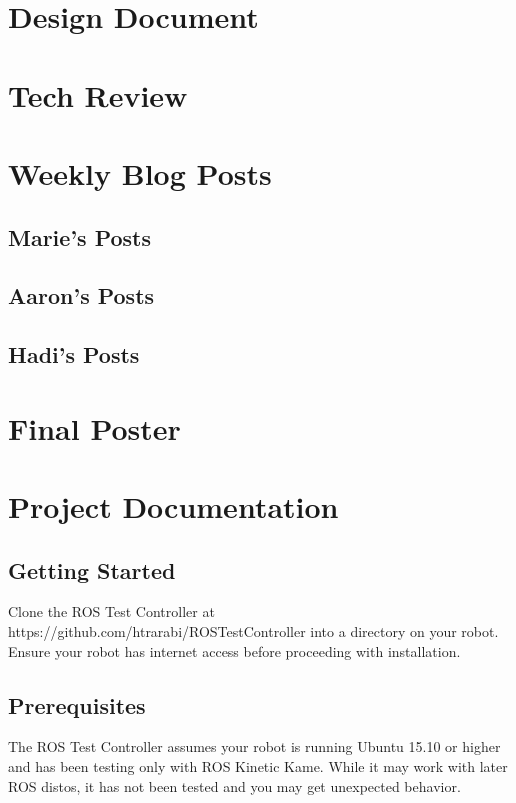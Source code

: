 \documentclass[onecolumn, draftclsnofoot,10pt, compsoc]{report}
\begin{document}
\chapter{Design Document}
\minitoc

\chapter{Tech Review}
\minitoc

\chapter{Weekly Blog Posts}
\minitoc
\section{Marie's Posts}
\section{Aaron's Posts}
\section{Hadi's Posts}

\chapter{Final Poster}
\minitoc

\chapter{Project Documentation}

\minitoc
\section{Getting Started}


Clone the ROS Test Controller at https://github.com/htrarabi/ROSTestController into a directory on your robot. Ensure your robot has internet access before proceeding with installation.

\section{Prerequisites}

The ROS Test Controller assumes your robot is running Ubuntu 15.10 or higher and has been testing only with ROS Kinetic Kame. While it may work with later ROS distos, it has not been tested and you may get unexpected behavior.
\end{document}
